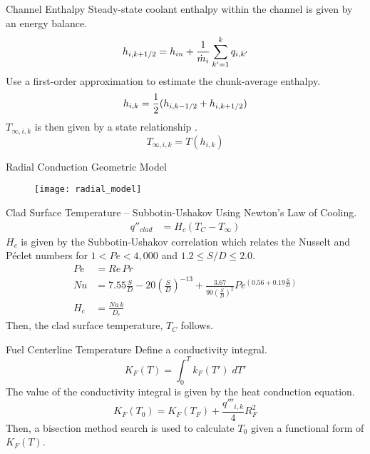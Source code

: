 \begin{frame}{Channel Enthalpy}
  Steady-state coolant enthalpy within the channel is given by an energy
  balance.
  \begin{equation}
    h_{i,k+1/2} = h_{in} + \frac{1}{\dot{m}_i} \sum_{k'=1}^{k} q_{i,k'}
  \end{equation}
  Use a first-order approximation to estimate the chunk-average enthalpy.
  \begin{equation}
    h_{i,k} = \frac{1}{2} (h_{i,k-1/2}+h_{i,k+1/2})
  \end{equation}
  $T_{\infty,i,k}$ is then given by a state relationship \cite{sodiumProp}.
  \begin{equation}
    T_{\infty,i,k} = T(h_{i,k})
  \end{equation}
\end{frame}

\begin{frame}{Radial Conduction Geometric Model}
  \begin{figure}
    \centering
    \texttt{[image: radial\_model]}
    \label{fig:radial_model}
  \end{figure}
\end{frame}

\begin{frame}{Clad Surface Temperature -- Subbotin-Ushakov}
  Using Newton's Law of Cooling.
  \begin{align}
    q''_{clad} &= H_c (T_C - T_{\infty}) %
  \end{align}
  $H_c$ is given by the Subbotin-Ushakov correlation \cite{subbotinUshakov}
  which relates the Nusselt and P\'eclet numbers for ${1 < Pe < 4,000}$ and 
  ${ 1.2 \le S/D \le 2.0 }$.
  \begin{align}
    Pe &= Re \, Pr \\
    \label{eq:subbotinUshakov}
    Nu &= 7.55 \frac{S}{D} - 20 \left(\frac{S}{D}\right)^{-13} + 
      \frac{3.67}{90\left(\frac{S}{D}\right)^{2}}
      Pe^{\left(0.56 + 0.19 \frac{S}{D}\right)} \\
    H_c &= \frac{N\!u \, k}{D_e} %
  \end{align}
  Then, the clad surface temperature, $T_C$ follows.
\end{frame}

\begin{frame}{Fuel Centerline Temperature}
  Define a conductivity integral.
  \begin{equation}
    \label{eq:conductivity_integral}
    K_F(T) = \int_0^T k_F(T') \; dT'
  \end{equation}
  The value of the conductivity integral is given by the heat conduction
  equation.
  \begin{equation}
    \label{eq:tcl_conductivity_integral}
    K_F(T_0) = K_F(T_F) + \frac{q'''_{i,k}}{4} R_F^2
  \end{equation}
  Then, a bisection method search is used to calculate $T_0$ given a functional
  form of $K_F(T)$.
\end{frame}

